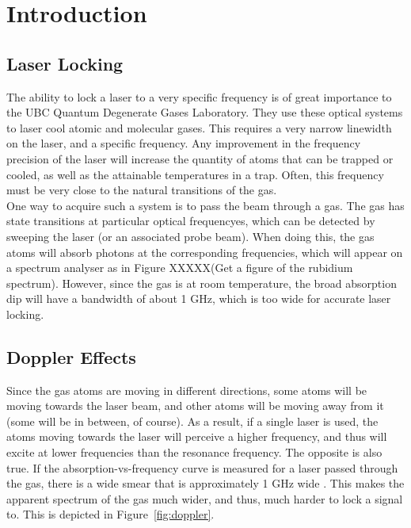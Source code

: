 \newpage
\section{Introduction}

\subsection{Laser Locking}

The ability to lock a laser to a very specific frequency is of great importance to the UBC Quantum Degenerate Gases Laboratory.  They use these optical systems to laser cool atomic and molecular gases.  This requires a very narrow linewidth on the laser, and a specific frequency.  Any improvement in the frequency precision of the laser will increase the quantity of atoms that can be trapped or cooled, as well as the attainable temperatures in a trap.  Often, this frequency must be very close to the natural transitions of the gas. \\

One way to acquire such a system is to pass the beam through a gas.  The gas has state transitions at particular optical frequencyes, which can be detected by sweeping the laser (or an associated probe beam).  When doing this, the gas atoms will absorb photons at the corresponding frequencies, which will appear on a spectrum analyser as in Figure XXXXX(Get a figure of the rubidium spectrum).  However, since the gas is at room temperature, the broad absorption dip will have a bandwidth of about 1 GHz, which is too wide for accurate laser locking.

\subsection{Doppler Effects}

Since the gas atoms are moving in different directions, some atoms will be moving towards the laser beam, and other atoms will be moving away from it (some will be in between, of course).  As a result, if a single laser is used, the atoms moving towards the laser will perceive a higher frequency, and thus will excite at lower frequencies than the resonance frequency.  The opposite is also true.  If the absorption-vs-frequency curve is measured for a laser passed through the gas, there is a wide smear that is approximately 1 GHz wide \cite{madison14}.  This makes the apparent spectrum of the gas much wider, and thus, much harder to lock a signal to.  This is depicted in Figure~\ref{fig:doppler}. \\

